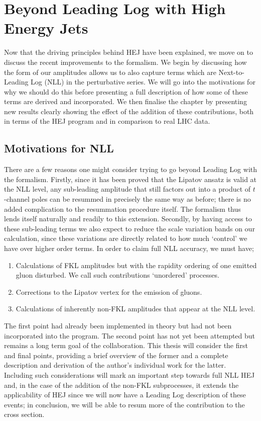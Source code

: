 \chapter{Beyond Leading Log with High Energy Jets}

Now that the driving principles behind HEJ have been explained, we move on to discuss the recent improvements to the formalism. We begin by discussing how the form of our amplitudes allows us to also capture terms which are Next-to-Leading Log (NLL) in the perturbative series. We will go into the motivations for why we should do this before presenting a full description of how some of these terms are derived and incorporated. We then finalise the chapter by presenting new results clearly showing the effect of the addition of these contributions, both in terms of the HEJ program and in comparison to real LHC data. 

\section{Motivations for NLL}

There are a few reasons one might consider trying to go beyond Leading Log with the formalism. Firstly, since it has been proved that the Lipatov ansatz is valid at the NLL level, any sub-leading amplitude that still factors out into a product of $t$-channel poles can be resummed in precisely the same way as before; there is no added complication to the resummation procedure itself. The formalism thus lends itself naturally and readily to this extension. Secondly, by having access to these sub-leading terms we also expect to reduce the scale variation bands on our calculation, since these variations are directly related to how much `control' we have over higher order terms. In order to claim full NLL accuracy, we must have;

\begin{enumerate}
\item{Calculations of FKL amplitudes but with the rapidity ordering of one emitted gluon disturbed. We call such contributions `unordered' processes.}
\item{Corrections to the Lipatov vertex for the emission of gluons.}
\item{Calculations of inherently non-FKL amplitudes that appear at the NLL level.}
\end{enumerate}

The first point had already been implemented in theory but had not been incorporated into the program. The second point has not yet been attempted but remains a long term goal of the collaboration. This thesis will consider the first and final points, providing a brief overview of the former and a complete description and derivation of the author's individual work for the latter. Including such considerations will mark an important step towards full NLL HEJ and, in the case of the addition of the non-FKL subprocesses, it extends the applicability of HEJ since we will now have a Leading Log description of these events; in conclusion, we will be able to resum more of the contribution to the cross section. 

